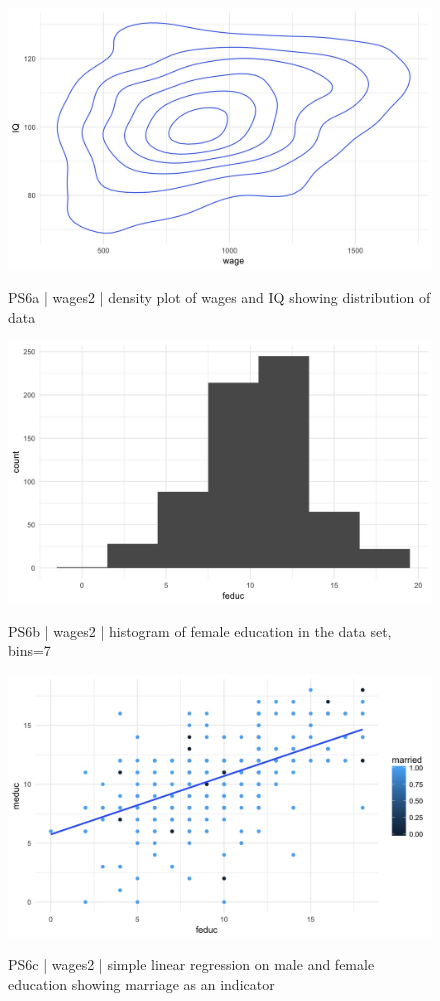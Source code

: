 \documentclass{article}
\begin{document}
\begin{figure}
\centering
\includegraphics[scale=.25]{PS6a_Hoehne.png}\\
\caption{PS6a | wages2 | density plot of wages and IQ showing distribution of data }
\end{figure}

\begin{figure}
\centering
\includegraphics[scale=.25]{PS6b_Hoehne.png}\\
\caption{PS6b | wages2 | histogram of female education in the data set, bins=7 }
\end{figure}

\begin{figure}
\centering
\includegraphics[scale=.25]{PS6c_Hoehne.png}\\
\caption{PS6c | wages2 | simple linear regression on male and female education showing marriage as an indicator}
\end{figure}
\end{document}
